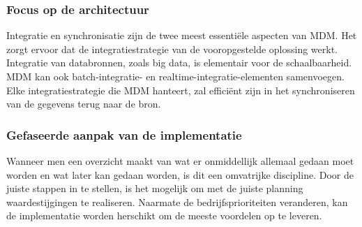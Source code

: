 
\subsubsection{Focus op de architectuur}
Integratie en synchronisatie zijn de twee meest essentiële aspecten van MDM. Het zorgt ervoor dat de integratiestrategie van de vooropgestelde oplossing werkt. Integratie van databronnen, zoals big data, is elementair voor de schaalbaarheid. MDM kan ook batch-integratie- en realtime-integratie-elementen samenvoegen. Elke integratiestrategie die MDM hanteert, zal efficiënt zijn in het synchroniseren van de gegevens terug naar de bron.


\subsubsection{Gefaseerde aanpak van de implementatie}
Wanneer men een overzicht maakt van wat er onmiddellijk allemaal gedaan moet worden en wat later kan gedaan worden, is dit een omvatrijke discipline. Door de juiste stappen in te stellen, is het mogelijk om met de juiste planning waardestijgingen te realiseren. Naarmate de bedrijfsprioriteiten veranderen, kan de implementatie worden herschikt om de meeste voordelen op te leveren.

